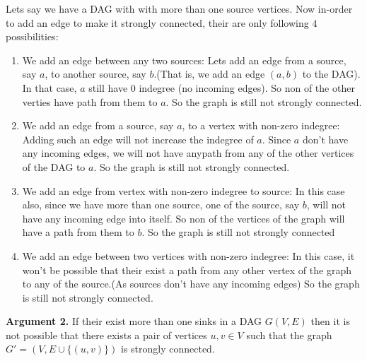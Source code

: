 \documentclass[answers]{exam}
\begin{document}
\begin{questions}
\begin{parts}
\begin{solution}
Lets say we have a DAG with with more than one source vertices. Now in-order to add an edge to make it strongly connected, their are only following $4$ possibilities:
\begin{enumerate}
    \item We add an edge between any two sources: Lets add an edge from a source, say $a$, to another source, say $b$.(That is, we add an edge $(a,b)$ to the DAG). In that case, $a$ still have $0$ indegree (no incoming edges). So non of the other verties have path from them to $a$. So the graph is still not strongly connected.
    \item We add an edge from a source, say $a$, to a vertex with non-zero indegree: Adding such an edge will not increase the indegree of $a$. Since $a$ don't have any incoming edges, we will not have anypath from any of the other vertices of the DAG to $a$.  So the graph is still not strongly connected.
    \item We add an edge from vertex with non-zero indegree to source: In this case also, since we have more than one source, one of the source, say $b$, will not have any incoming edge into itself. So non of the vertices of the graph will have a path from them to $b$. So the graph is still not strongly connected
    \item We add an edge between two vertices with non-zero indegree: In this case, it won't be possible that their exist a path from any other vertex of the graph to any of the source.(As sources don't have any incoming edges) So the graph is still not strongly connected.
\end{enumerate}

\textbf{Argument 2.} If their exist more than one sinks  in a DAG $G(V,E)$ then it is not possible that there exists a pair of vertices $u, v \in V$ such that the graph $G' = (V, E \cup \{(u, v)\})$ is strongly connected.


\end{solution}
\end{parts}
\end{questions}
\end{document}
